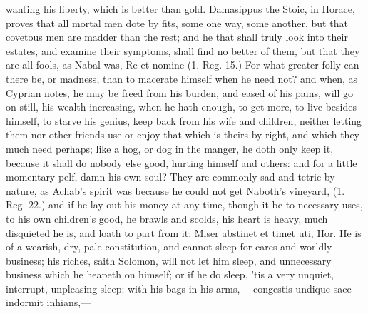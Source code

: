 {wanting his liberty, which is better than gold. Damasippus the Stoic,
in Horace, proves that all mortal men dote by fits, some one way, some
another, but that covetous men are madder than the rest; and he
that shall truly look into their estates, and examine their symptoms,
shall find no better of them, but that they are all fools, as
Nabal was, Re et nomine (1. Reg. 15.) For what greater folly can there
be, or  madness, than to macerate himself when he need not? and
when, as Cyprian notes, he may be freed from his burden, and
eased of his pains, will go on still, his wealth increasing, when he
hath enough, to get more, to live besides himself, to starve his
genius, keep back from his wife and children, neither letting
them nor other friends use or enjoy that which is theirs by right, and
which they much need perhaps; like a hog, or dog in the manger, he doth
only keep it, because it shall do nobody else good, hurting himself and
others: and for a little momentary pelf, damn his own soul? They are
commonly sad and tetric by nature, as Achab's spirit was because he
could not get Naboth's vineyard, (1. Reg. 22.) and if he lay out his
money at any time, though it be to necessary uses, to his own
children's good, he brawls and scolds, his heart is heavy, much
disquieted he is, and loath to part from it: Miser abstinet et timet
uti, Hor. He is of a wearish, dry, pale constitution, and cannot sleep
for cares and worldly business; his riches, saith Solomon, will not let
him sleep, and unnecessary business which he heapeth on himself; or if
he do sleep, 'tis a very unquiet, interrupt, unpleasing sleep: with his
bags in his arms,
---congestis undique sacc
indormit inhians,---

}
